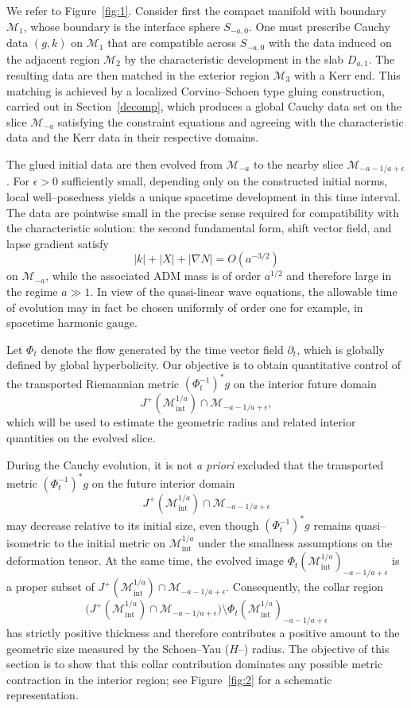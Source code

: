 \documentclass{amsart}
\begin{document}
\noindent We refer to Figure~\ref{fig:1}. Consider first the compact manifold with boundary
$\mathcal M_{1}$, whose boundary is the interface sphere $S_{-a,0}$. One must prescribe
Cauchy data $(g,k)$ on $\mathcal M_{1}$ that are compatible across $S_{-a,0}$ with the
data induced on the adjacent region $\mathcal M_{2}$ by the characteristic development in
the slab $D_{a,1}$. The resulting data are then matched in the exterior region
$\mathcal M_{3}$ with a Kerr end. This matching is achieved by a localized
Corvino–Schoen type gluing construction, carried out in
Section~\ref{decomp}, which produces a global Cauchy data set on the slice
$\mathcal M_{-a}$ satisfying the constraint equations and agreeing with the
characteristic data and the Kerr data in their respective domains.

\noindent The glued initial data are then evolved from $\mathcal M_{-a}$ to the nearby slice
$\mathcal M_{-a-1/a+\epsilon}$. For $\epsilon>0$ sufficiently small, depending only on
the constructed initial norms, local well–posedness yields a unique spacetime
development in this time interval. The data are pointwise small in the precise sense
required for compatibility with the characteristic solution: the second fundamental form,
shift vector field, and lapse gradient satisfy
\[
|k| + |X| + |\nabla N| = O(a^{-3/2})
\]
on $\mathcal M_{-a}$, while the associated ADM mass is of order $a^{1/2}$ and therefore
large in the regime $a\gg 1$. In view of the quasi-linear wave equations, the allowable
time of evolution may in fact be chosen uniformly of order one for example, in spacetime harmonic gauge.

\noindent Let $\Phi_t$ denote the flow generated by the time vector field $\partial_t$, which is
globally defined by global hyperbolicity. Our objective is to obtain quantitative control
of the transported Riemannian metric $(\Phi_t^{-1})^{*}g$ on the interior future domain
\[
J^{+}(\mathcal M^{1/a}_{\mathrm{int}})\cap \mathcal M_{-a-1/a+\epsilon},
\]
which will be used to estimate the geometric radius and related interior quantities on the
evolved slice.

\noindent During the Cauchy evolution, it is not \emph{a priori} excluded that the transported
metric $(\Phi_t^{-1})^{*}g$ on the future interior domain
\[
J^{+}(\mathcal M^{1/a}_{\mathrm{int}})\cap \mathcal M_{-a-1/a+\epsilon}
\]
may decrease relative to its initial size, even though $(\Phi_t^{-1})^{*}g$ remains
quasi–isometric to the initial metric on $\mathcal M^{1/a}_{\mathrm{int}}$ under the
smallness assumptions on the deformation tensor. At the same time, the evolved image
$\Phi_t(\mathcal M^{1/a}_{\mathrm{int}})_{-a-1/a+\epsilon}$ is a proper subset of
$J^{+}(\mathcal M^{1/a}_{\mathrm{int}})\cap \mathcal M_{-a-1/a+\epsilon}$. Consequently,
the collar region
\[
\Big(J^{+}(\mathcal M^{1/a}_{\mathrm{int}})\cap \mathcal M_{-a-1/a+\epsilon}\Big)
\setminus
\Phi_t(\mathcal M^{1/a}_{\mathrm{int}})_{-a-1/a+\epsilon}
\]
has strictly positive thickness and therefore contributes a positive amount to the
geometric size measured by the Schoen–Yau ($H$–) radius. The objective of this section
is to show that this collar contribution dominates any possible metric contraction in the
interior region; see Figure~\ref{fig:2} for a schematic representation.
\end{document}
